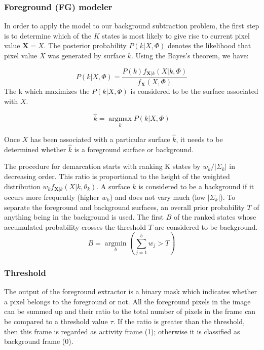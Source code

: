 \subsubsection{Foreground (FG) modeler}
In order to apply the model to our background subtraction problem, the first step is to determine which of the $K$ states is most likely to give rise to current pixel value $\mathbf{X}=X$. The posterior probability $P(k|X,\Phi)$ denotes the likelihood that pixel value $X$ was generated by surface $k$. Using the Bayes's theorem, we have:

$$ P(k|X,\Phi) = \frac{P(k)f_{\mathbf{X}|k}(X|k,\Phi)}{f_\mathbf{X}(X,\Phi)} $$
The k which maximizes the $P(k|X,\Phi) $ is considered to be the surface associated with $X$.

$$ \hat{k}=\operatorname*{argmax}_k P(k|X,\Phi)$$

Once $X$ has been associated with a particular surface $\hat{k}$, it needs to be determined whether $\hat{k}$ is a foreground surface or background. 

The procedure for demarcation starts with ranking K states by $w_k / | \Sigma_k |$ in decreasing order. This ratio is proportional to the height of the weighted distribution $w_k f_{\mathbf{X}|k}(X|k,\theta_k)$. A surface $k$ is considered to be a background if it occurs more frequently (higher $w_k$) and does not vary much (low $|\Sigma_k|$).  To separate the foreground and background surfaces, an overall prior probability $T$ of anything being in the background is used. The first $B$ of the ranked  states whose accumulated probability crosses the threshold $T$ are considered to be background. 
$$ B=\operatorname*{argmin}_b (\sum_{j=1}^b w_{j} > T)$$ 

\subsubsection{Threshold}
The output of the foreground extractor is a binary mask which indicates whether a pixel belongs to the foreground or not. All the foreground pixels in the image can be summed up and their ratio to the total number of pixels in the frame can be compared to a threshold value $\tau$. If the ratio is greater than the threshold, then this frame is regarded as activity frame (1); otherwise it is classified as background frame (0). 


